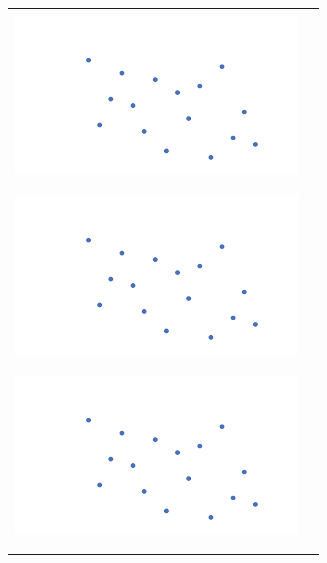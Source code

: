 \documentclass[a4paper,12pt]{article}
\begin{document}
\newpage

\begin{center}
\begin{tabular}{|c|c|}
\hline
 & \\
\hspace{10pt}\includegraphics[width=7.5cm]{../images/spatial_subd.pdf}
\hspace{10pt} & \hspace{175pt} \\
 & \\
\hline
 & \\
\hspace{10pt}\includegraphics[width=7.5cm]{../images/spatial_subd.pdf}
\hspace{10pt} & \hspace{10pt} \\
 & \\
\hline
 & \\
\hspace{10pt}\includegraphics[width=7.5cm]{../images/spatial_subd.pdf}
\hspace{10pt} & \hspace{10pt} \\
 & \\
\hline
 & \\

\end{tabular}
\end{center}
\end{document}
